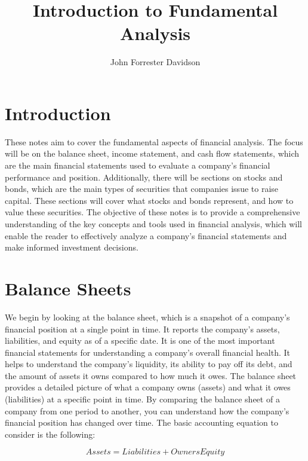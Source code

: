 \documentclass{article}
\title{Introduction to Fundamental Analysis}
\author{John Forrester Davidson}
\date{} %
\begin{document}
\maketitle
\tableofcontents

\section{Introduction}

These notes aim to cover the fundamental aspects of financial analysis. The focus will be on the balance sheet, income statement, and cash flow statements, which are the main financial statements used to evaluate a company's financial performance and position. Additionally, there will be sections on stocks and bonds, which are the main types of securities that companies issue to raise capital. These sections will cover what stocks and bonds represent, and how to value these securities. The objective of these notes is to provide a comprehensive understanding of the key concepts and tools used in financial analysis, which will enable the reader to effectively analyze a company's financial statements and make informed investment decisions.

\section{Balance Sheets}

We begin by looking at the balance sheet, which is a snapshot of a company's financial position at a single point in time. It reports the company's assets, liabilities, and equity as of a specific date. It is one of the most important financial statements for understanding a company's overall financial health. It helps to understand the company's liquidity, its ability to pay off its debt, and the amount of assets it owns compared to how much it owes. The balance sheet provides a detailed picture of what a company owns (assets) and what it owes (liabilities) at a specific point in time. By comparing the balance sheet of a company from one period to another, you can understand how the company's financial position has changed over time. The basic accounting equation to consider is the following: 

\begin{equation}
    Assets = Liabilities + Owners Equity
\end{equation}
\end{document}

